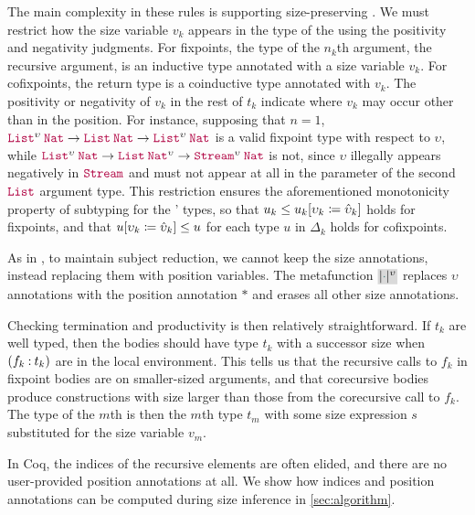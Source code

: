The main complexity in these rules is supporting size-preserving \cofixpoints.
We must restrict how the size variable $v_k$ appears in the type of the \cofixpoints using the positivity and negativity judgments.
For fixpoints, the type of the $n_k$th argument, the recursive argument, is an inductive type annotated with a size variable $v_k$.
For cofixpoints, the return type is a coinductive type annotated with $v_k$.
The positivity or negativity of $v_k$ in the rest of $t_k$ indicate where $v_k$ may occur other than in the \corecursive position.
For instance, supposing that $n = 1$,
$\app{\List^\upsilon}{\Nat} \to \app{\List}{\Nat} \to \app{\List^\upsilon}{\Nat}$
is a valid fixpoint type with respect to $\upsilon$, while
$\app{\List^\upsilon}{\Nat} \to \app{\List}{\Nat^\upsilon} \to \app{\Stream^\upsilon}{\Nat}$
is not, since $\upsilon$ illegally appears negatively in $\Stream$ and must not appear at all in the parameter of the second $\List$ argument type.
This restriction ensures the aforementioned monotonicity property of subtyping for the \cofixpoints' types,
so that $u_k \leq u_k [\upsilon_k \coloneqq \hat{\upsilon}_k]$ holds for fixpoints,
and that $u [\upsilon_k \coloneqq \hat{\upsilon}_k] \leq u$ for each type $u$ in $\Delta_k$ holds for cofixpoints.

As in , to maintain subject reduction, we cannot keep the size annotations, instead replacing them with position variables.
The metafunction $\new{\erase{\ph}^\upsilon}$ replaces $\upsilon$ annotations with the position annotation $\ast$ and erases all other size annotations.

Checking termination and productivity is then relatively straightforward.
If $t_k$ are well typed, then the \cofixpoint bodies should have type $t_k$ with a successor size when $(f_k \mathbin{:} t_k)$ are in the local environment.
This tells us that the recursive calls to $f_k$ in fixpoint bodies are on smaller-sized arguments, and that corecursive bodies produce constructions with size larger than those from the corecursive call to $f_k$.
The type of the $m$th \cofixpoint is then the $m$th type $t_m$ with some size expression $s$ substituted for the size variable $v_m$.

In Coq, the indices of the recursive elements are often elided, and there are no user-provided position annotations at all.
We show how indices and position annotations can be computed during size inference in \autoref{sec:algorithm}.

